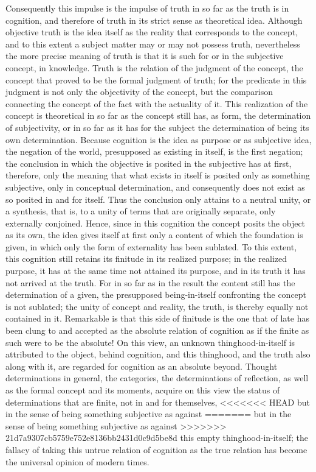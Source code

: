 Consequently this impulse is
the impulse of truth in so far as
the truth is in cognition,
and therefore of truth in its strict sense
as theoretical idea.
Although objective truth is
the idea itself as the reality
that corresponds to the concept,
and to this extent a subject matter
may or may not possess truth,
nevertheless the more precise meaning of truth is
that it is such for or in
the subjective concept, in knowledge.
Truth is the relation of the
judgment of the concept,
the concept that proved to be
the formal judgment of truth;
for the predicate in this judgment is
not only the objectivity of the concept,
but the comparison connecting
the concept of the fact
with the actuality of it.
This realization of the concept is theoretical
in so far as the concept still has, as form,
the determination of subjectivity, or in so far
as it has for the subject the determination of
being its own determination.
Because cognition is the idea as purpose
or as subjective idea,
the negation of the world,
presupposed as existing in itself,
is the first negation;
the conclusion in which the objective is posited
in the subjective has at first, therefore,
only the meaning that what exists in itself is
posited only as something subjective,
only in conceptual determination,
and consequently does not exist as
so posited in and for itself.
Thus the conclusion only attains
to a neutral unity, or a synthesis,
that is, to a unity of terms that
are originally separate, only externally conjoined.
Hence, since in this cognition the concept
posits the object as its own,
the idea gives itself at first
only a content of which the foundation is given,
in which only the form of externality has been sublated.
To this extent, this cognition still retains
its finitude in its realized purpose;
in the realized purpose, it has at the same time
not attained its purpose,
and in its truth it has not arrived at the truth.
For in so far as in the result
the content still has
the determination of a given,
the presupposed being-in-itself confronting
the concept is not sublated;
the unity of concept and reality, the truth,
is thereby equally not contained in it.
Remarkable is that this side of finitude is
the one that of late has been clung to
and accepted as the absolute relation of cognition
as if the finite as such were to be the absolute!
On this view, an unknown thinghood-in-itself is
attributed to the object, behind cognition,
and this thinghood, and the truth also along with it,
are regarded for cognition as an absolute beyond.
Thought determinations in general, the categories,
the determinations of reflection,
as well as the formal concept and its moments,
acquire on this view the status of
determinations that are finite,
not in and for themselves,
<<<<<<< HEAD
but in the sense of being something subjective as against
=======
but in the sense of being
something subjective as against
>>>>>>> 21d7a9307cb5759e752e8136bb2431d0c9d5be8d
this empty thinghood-in-itself;
the fallacy of taking this
untrue relation of cognition as
the true relation has become
the universal opinion of modern times.

